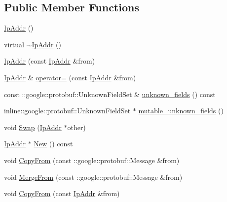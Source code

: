 \subsection*{Public Member Functions}
\begin{DoxyCompactItemize}
\item 
\hyperlink{class_i_m_1_1_base_define_1_1_ip_addr_a44f576b6e16267827fd6f6a779f762ca}{Ip\+Addr} ()
\item 
virtual \hyperlink{class_i_m_1_1_base_define_1_1_ip_addr_a2cc018d6491bacd3a2c71adb5b857a8d}{$\sim$\+Ip\+Addr} ()
\item 
\hyperlink{class_i_m_1_1_base_define_1_1_ip_addr_a7d794896c538a05e63ecd5e8b9725a6c}{Ip\+Addr} (const \hyperlink{class_i_m_1_1_base_define_1_1_ip_addr}{Ip\+Addr} \&from)
\item 
\hyperlink{class_i_m_1_1_base_define_1_1_ip_addr}{Ip\+Addr} \& \hyperlink{class_i_m_1_1_base_define_1_1_ip_addr_a8913d4d0577f44dd3f2df62d6ca51540}{operator=} (const \hyperlink{class_i_m_1_1_base_define_1_1_ip_addr}{Ip\+Addr} \&from)
\item 
const \+::google\+::protobuf\+::\+Unknown\+Field\+Set \& \hyperlink{class_i_m_1_1_base_define_1_1_ip_addr_a5684e55799e2c6dc58f10c2d80491b05}{unknown\+\_\+fields} () const 
\item 
inline\+::google\+::protobuf\+::\+Unknown\+Field\+Set $\ast$ \hyperlink{class_i_m_1_1_base_define_1_1_ip_addr_ac46e45b70cfad35e2d06981db7f09871}{mutable\+\_\+unknown\+\_\+fields} ()
\item 
void \hyperlink{class_i_m_1_1_base_define_1_1_ip_addr_a3b4e2da9d2aa13b319bc4feded2fe3aa}{Swap} (\hyperlink{class_i_m_1_1_base_define_1_1_ip_addr}{Ip\+Addr} $\ast$other)
\item 
\hyperlink{class_i_m_1_1_base_define_1_1_ip_addr}{Ip\+Addr} $\ast$ \hyperlink{class_i_m_1_1_base_define_1_1_ip_addr_aff54049688c19ca67c59366f1d45c080}{New} () const 
\item 
void \hyperlink{class_i_m_1_1_base_define_1_1_ip_addr_aa9656e2cde719b776273a89acd3d7c61}{Copy\+From} (const \+::google\+::protobuf\+::\+Message \&from)
\item 
void \hyperlink{class_i_m_1_1_base_define_1_1_ip_addr_a35175f78809a4a53a1a8ba1aab2e83a8}{Merge\+From} (const \+::google\+::protobuf\+::\+Message \&from)
\item 
void \hyperlink{class_i_m_1_1_base_define_1_1_ip_addr_afccaec38840e63d2d4402c2e88ea2d20}{Copy\+From} (const \hyperlink{class_i_m_1_1_base_define_1_1_ip_addr}{Ip\+Addr} \&from)
\item 

\end{DoxyCompactItemize}

